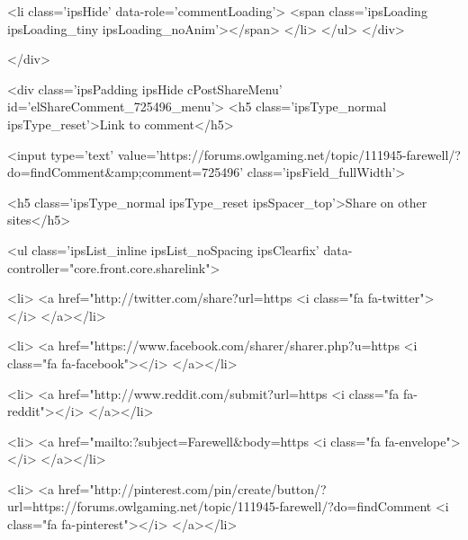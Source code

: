 					
					<li class='ipsHide' data-role='commentLoading'>
						<span class='ipsLoading ipsLoading_tiny ipsLoading_noAnim'></span>
					</li>
				</ul>
			</div>
		

		
	</div>

	

	



<div class='ipsPadding ipsHide cPostShareMenu' id='elShareComment_725496_menu'>
	<h5 class='ipsType_normal ipsType_reset'>Link to comment</h5>
	
		
	
	
	<input type='text' value='https://forums.owlgaming.net/topic/111945-farewell/?do=findComment&amp;comment=725496' class='ipsField_fullWidth'>

	
	<h5 class='ipsType_normal ipsType_reset ipsSpacer_top'>Share on other sites</h5>
	

	<ul class='ipsList_inline ipsList_noSpacing ipsClearfix' data-controller="core.front.core.sharelink">
		
			<li>
<a href="http://twitter.com/share?url=https%
	<i class="fa fa-twitter"></i>
</a></li>
		
			<li>
<a href="https://www.facebook.com/sharer/sharer.php?u=https%
	<i class="fa fa-facebook"></i>
</a></li>
		
			<li>
<a href="http://www.reddit.com/submit?url=https%
	<i class="fa fa-reddit"></i>
</a></li>
		
			<li>
<a href="mailto:?subject=Farewell&body=https%
	<i class="fa fa-envelope"></i>
</a></li>
		
			<li>
<a href="http://pinterest.com/pin/create/button/?url=https://forums.owlgaming.net/topic/111945-farewell/?do=findComment%
	<i class="fa fa-pinterest"></i>
</a></li>
		
